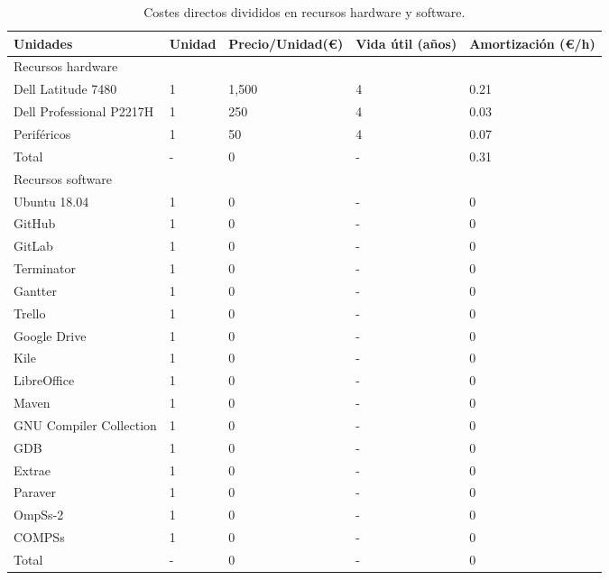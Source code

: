 \begin{table}[H]
\centering
 \begin{tabular}{| l | l | l | l | l |}
    \hline
    Unidades & Unidad & Precio/Unidad(\euro) & Vida útil (años) & Amortización (\euro/h) \\
    \hline
    \cline{1-1}
    \rowcolor{gray!50}
    Recursos hardware \\
    \hline
    Dell Latitude 7480          & 1 & 1,500  & 4 & 0.21\\
    \hline 
    Dell Professional P2217H    & 1 & 250   & 4 & 0.03\\
    \hline
    Periféricos                 & 1 & 50    & 4 & 0.07\\
    \hline
    \rowcolor{gray!50}
    Total                       & - & 0     & - & 0.31\\
    \hline
    \cline{1-1}
    \rowcolor{gray!50}
    Recursos software \\
    \hline
    Ubuntu 18.04                & 1 & 0     & - & 0\\
    \hline
    GitHub                      & 1 & 0     & - & 0\\
    \hline
    GitLab                      & 1 & 0     & - & 0\\
    \hline
    Terminator                  & 1 & 0     & - & 0\\
    \hline
    Gantter                     & 1 & 0     & - & 0\\
    \hline
    Trello                      & 1 & 0     & - & 0\\
    \hline
    Google Drive                & 1 & 0     & - & 0\\
    \hline
    Kile                        & 1 & 0     & - & 0\\
    \hline
    LibreOffice                 & 1 & 0     & - & 0\\
    \hline
    Maven                       & 1 & 0     & - & 0\\
    \hline
    GNU Compiler Collection     & 1 & 0     & - & 0\\
    \hline
    GDB                         & 1 & 0     & - & 0\\
    \hline
    Extrae                      & 1 & 0     & - & 0\\
    \hline
    Paraver                     & 1 & 0     & - & 0\\
    \hline
    OmpSs-2                     & 1 & 0     & - & 0\\
    \hline
    COMPSs                      & 1 & 0     & - & 0\\
    \hline
    \rowcolor{gray!50}
    Total                       & - & 0     & - & 0\\
    \hline
 \end{tabular}
\caption{Costes directos divididos en recursos hardware y software.}
\end{table}

